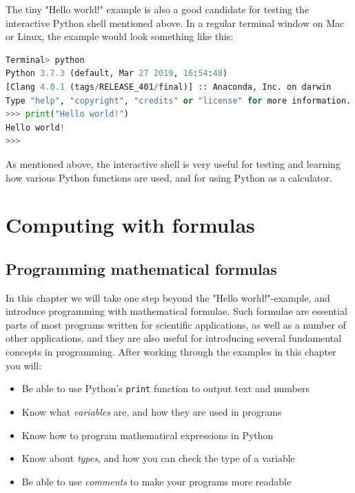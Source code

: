 \documentclass[graybox,envcountchap,sectrefs,final]{svmonodo}
\begin{document}
The tiny "Hello world!" example is also a good candidate for testing the interactive Python shell mentioned above.
In a regular terminal window on Mac or Linux, the example would look something like this:
\begin{lstlisting}[language=Python,style=blue1]
Terminal> python
Python 3.7.3 (default, Mar 27 2019, 16:54:48)
[Clang 4.0.1 (tags/RELEASE_401/final)] :: Anaconda, Inc. on darwin
Type "help", "copyright", "credits" or "license" for more information.
>>> print("Hello world!")
Hello world!
>>>
\end{lstlisting}
As mentioned above, the interactive shell is very useful for testing and learning how various Python functions are used, and for using
Python as a calculator. 
\chapter{Computing with formulas}
\label{ch:formulas}




\section{Programming mathematical formulas}
In this chapter we will take one step beyond the "Hello world!"-example, and introduce programming
with mathematical formulae. Such formulae are essential parts of most programs written for scientific applications,
as well as a number of other applications, and they are also useful for introducing several fundamental concepts
in programming. After working through the examples in this chapter you will:
\begin{itemize}
 \item Be able to use Python's \texttt{print} function to output text and numbers

 \item Know what \emph{variables} are, and how they are used in programs

 \item Know how to program mathematical expressions in Python

 \item Know about \emph{types}, and how you can check the type of a variable

 \item Be able to use \emph{comments} to make your programs more readable
\end{itemize}
\end{document}
